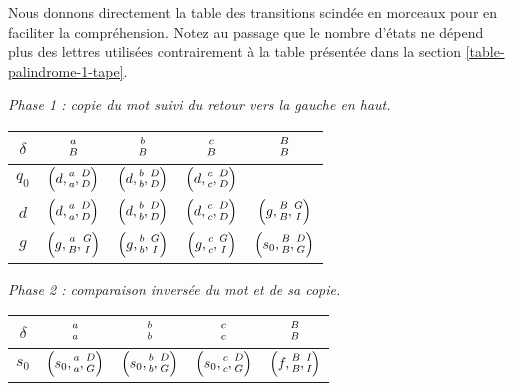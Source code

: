 Nous donnons directement la table des transitions scindée en morceaux pour en faciliter la compréhension. Notez au passage que le nombre d'états ne dépend plus des lettres utilisées contrairement à la table présentée dans la section \ref{table-palindrome-1-tape}.


\begin{center}
	\emph{\small Phase 1 : copie du mot suivi du retour vers la gauche en haut.}
	
	\smallskip
	\renewcommand{\arraystretch}{1.25}
	\begin{tabular}{|c||c|c|c|c|}
		\hline
		$\delta$
			& $\twocoord{a}{B}$
			& $\twocoord{b}{B}$
			& $\twocoord{c}{B}$
			& $\twocoord{B}{B}$ \\
		\hline
		\hline
		$q_0$
			& $\left( d , \twocoord{a}{a} , \twocoord{D}{D} \right)$
			& $\left( d , \twocoord{b}{b} , \twocoord{D}{D} \right)$
			& $\left( d , \twocoord{c}{c} , \twocoord{D}{D} \right)$
			&                                                        \\
		\hline
		$d$
			& $\left( d , \twocoord{a}{a} , \twocoord{D}{D} \right)$
			& $\left( d , \twocoord{b}{b} , \twocoord{D}{D} \right)$
			& $\left( d , \twocoord{c}{c} , \twocoord{D}{D} \right)$
			& $\left( g , \twocoord{B}{B} , \twocoord{G}{I} \right)$ \\
		\hline
		$g$
			& $\left( g   , \twocoord{a}{B} , \twocoord{G}{I} \right)$
			& $\left( g   , \twocoord{b}{b} , \twocoord{G}{I} \right)$
			& $\left( g   , \twocoord{c}{c} , \twocoord{G}{I} \right)$
			& $\left( s_0 , \twocoord{B}{B} , \twocoord{D}{G} \right)$ \\
		\hline
	\end{tabular}
	\renewcommand{\arraystretch}{1}
\end{center}


\begin{center}
	\emph{\small Phase 2 : comparaison \emph{\og inversée \fg} du mot et de sa copie.}
	
	\smallskip
	\renewcommand{\arraystretch}{1.25}
	\begin{tabular}{|c||c|c|c|c|}
		\hline
		$\delta$
			& $\twocoord{a}{a}$
			& $\twocoord{b}{b}$
			& $\twocoord{c}{c}$
			& $\twocoord{B}{B}$ \\
		\hline
		\hline
		$s_0$
			& $\left( s_0 , \twocoord{a}{a} , \twocoord{D}{G} \right)$
			& $\left( s_0 , \twocoord{b}{b} , \twocoord{D}{G} \right)$
			& $\left( s_0 , \twocoord{c}{c} , \twocoord{D}{G} \right)$
			& $\left( f   , \twocoord{B}{B} , \twocoord{I}{I} \right)$ \\
		\hline
	\end{tabular}
	\renewcommand{\arraystretch}{1}
\end{center}